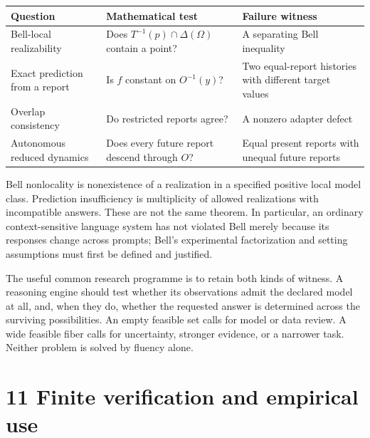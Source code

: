 \documentclass[
]{article}
\begin{document}
\begin{longtable}[]{@{}
  >{\raggedright\arraybackslash}p{}
  >{\raggedright\arraybackslash}p{}
  >{\raggedright\arraybackslash}p{}@{}}
\toprule\noalign{}
\begin{minipage}[b]{\linewidth}\raggedright
Question
\end{minipage} & \begin{minipage}[b]{\linewidth}\raggedright
Mathematical test
\end{minipage} & \begin{minipage}[b]{\linewidth}\raggedright
Failure witness
\end{minipage} \\
\midrule\noalign{}
\endhead
\bottomrule\noalign{}
\endlastfoot
Bell-local realizability & Does \(T^{-1}(p)\cap\Delta(\Omega)\) contain a point? & A separating Bell inequality \\
Exact prediction from a report & Is \(f\) constant on \(O^{-1}(y)\)? & Two equal-report histories with different target values \\
Overlap consistency & Do restricted reports agree? & A nonzero adapter defect \\
Autonomous reduced dynamics & Does every future report descend through \(O\)? & Equal present reports with unequal future reports \\
\end{longtable}

Bell nonlocality is nonexistence of a realization in a specified positive local model class. Prediction insufficiency is multiplicity of allowed realizations with incompatible answers. These are not the same theorem. In particular, an ordinary context-sensitive language system has not violated Bell merely because its responses change across prompts; Bell's experimental factorization and setting assumptions must first be defined and justified.

The useful common research programme is to retain both kinds of witness. A reasoning engine should test whether its observations admit the declared model at all, and, when they do, whether the requested answer is determined across the surviving possibilities. An empty feasible set calls for model or data review. A wide feasible fiber calls for uncertainty, stronger evidence, or a narrower task. Neither problem is solved by fluency alone.

\section{11 Finite verification and empirical use}\label{finite-verification-and-empirical-use}
\end{document}
